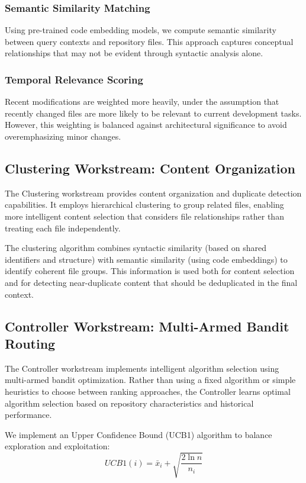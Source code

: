 \documentclass[conference]{IEEEtran}
\begin{document}
\subsubsection{Semantic Similarity Matching}
Using pre-trained code embedding models, we compute semantic similarity between query contexts and repository files. This approach captures conceptual relationships that may not be evident through syntactic analysis alone.

\subsubsection{Temporal Relevance Scoring}
Recent modifications are weighted more heavily, under the assumption that recently changed files are more likely to be relevant to current development tasks. However, this weighting is balanced against architectural significance to avoid overemphasizing minor changes.

\subsection{Clustering Workstream: Content Organization}

The Clustering workstream provides content organization and duplicate detection capabilities. It employs hierarchical clustering to group related files, enabling more intelligent content selection that considers file relationships rather than treating each file independently.

The clustering algorithm combines syntactic similarity (based on shared identifiers and structure) with semantic similarity (using code embeddings) to identify coherent file groups. This information is used both for content selection and for detecting near-duplicate content that should be deduplicated in the final context.

\subsection{Controller Workstream: Multi-Armed Bandit Routing}

The Controller workstream implements intelligent algorithm selection using multi-armed bandit optimization. Rather than using a fixed algorithm or simple heuristics to choose between ranking approaches, the Controller learns optimal algorithm selection based on repository characteristics and historical performance.

We implement an Upper Confidence Bound (UCB1) algorithm to balance exploration and exploitation:
\begin{equation}
UCB1(i) = \bar{x}_i + \sqrt{\frac{2 \ln n}{n_i}}
\end{equation}
\end{document}
